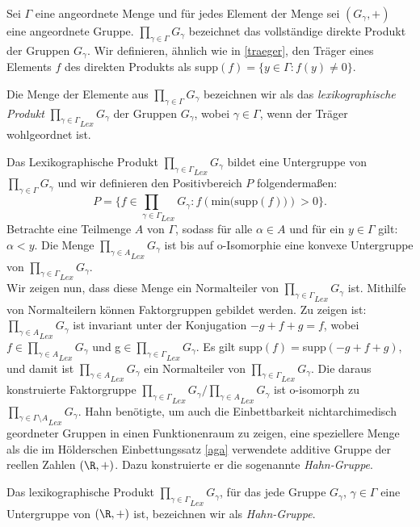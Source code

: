 Sei $\Gamma$ eine angeordnete Menge und für jedes Element der Menge sei $\left(G_\gamma, +\right)$ eine angeordnete Gruppe. $\prod_{\gamma \in \Gamma} G_\gamma$ bezeichnet das vollständige direkte Produkt der Gruppen $G_\gamma$. Wir definieren, ähnlich wie in \ref{traeger}, den Träger eines Elements $f$ des direkten Produkts als supp$\left(f\right) = \lbrace y \in \Gamma: f(y) \neq 0 \rbrace$. \cite{priesscrampe83}
\begin{defn} %
Die Menge der Elemente aus $\prod_{\gamma \in \Gamma} G_\gamma$ bezeichnen wir als das \textit{lexikographische Produkt} ${\prod_{\gamma \in \Gamma}}_{Lex} G_\gamma$ der Gruppen $G_\gamma$, wobei $\gamma \in \Gamma$, wenn der Träger wohlgeordnet ist.
\end{defn}
Das Lexikographische Produkt ${\prod_{\gamma \in \Gamma}}_{Lex} G_\gamma$ bildet eine Untergruppe von  $\prod_{\gamma \in \Gamma} G_\gamma$ und wir definieren den Positivbereich $P$ folgendermaßen:\\
\[ P = \lbrace f \in {\prod_{\gamma \in \Gamma}}_{Lex} G_\gamma: 
f\left(\text{min(supp}(f))\right) > 0 \rbrace.\]
Betrachte eine Teilmenge $A$ von $\Gamma$, sodass für alle $\alpha \in A$ und für ein $y\in\Gamma$ gilt: $\alpha < y$. Die Menge ${\prod_{\gamma \in A}}_{Lex} G_\gamma$ ist bis auf o-Isomorphie eine konvexe Untergruppe von ${\prod_{\gamma \in \Gamma}}_{Lex} G_\gamma$.\\
Wir zeigen nun, dass diese Menge ein Normalteiler von ${\prod_{\gamma \in \Gamma}}_{Lex} G_\gamma$ ist. Mithilfe von Normalteilern können Faktorgruppen gebildet werden. Zu zeigen ist:  ${\prod_{\gamma \in A}}_{Lex} G_\gamma$ ist invariant unter der Konjugation $-g+f+g = f$, wobei $f \in  {\prod_{\gamma \in A}}_{Lex} G_\gamma$ und g$\in  {\prod_{\gamma \in \Gamma}}_{Lex} G_\gamma$. Es gilt supp$\left(f\right) = $supp$\left(-g + f + g\right)$, und damit ist  ${\prod_{\gamma \in A}}_{Lex} G_\gamma$ ein Normalteiler von  ${\prod_{\gamma \in \Gamma}}_{Lex} G_\gamma$. Die daraus konstruierte Faktorgruppe  ${\prod_{\gamma \in \Gamma}}_{Lex} G_\gamma /  {\prod_{\gamma \in A}}_{Lex} G_\gamma$ ist o-isomorph zu  ${\prod_{\gamma \in \Gamma\setminus A}}_{Lex} G_\gamma$.
Hahn benötigte, um auch die Einbettbarkeit nichtarchimedisch geordneter Gruppen in einen Funktionenraum zu zeigen, eine speziellere Menge als die im Hölderschen Einbettungssatz \ref{aga} verwendete additive Gruppe der reellen Zahlen $\left(\R, +\right)$. Dazu konstruierte er die sogenannte \textit{Hahn-Gruppe}.
\begin{defn}\label{Hahn-Gruppe}  %
Das lexikographische Produkt  ${\prod_{\gamma \in \Gamma}}_{Lex} G_\gamma$, für das jede Gruppe $G_\gamma$, $\gamma \in\Gamma$ eine Untergruppe von $\left(\R, +\right)$ ist, bezeichnen wir als \textit{Hahn-Gruppe}.
\end{defn} 
